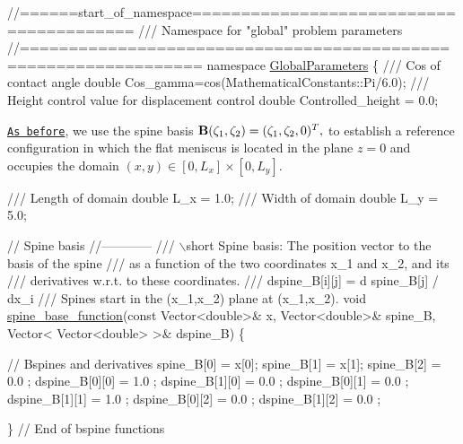  
\begin{DoxyCodeInclude}
\textcolor{comment}{//======start\_of\_namespace========================================}
\textcolor{comment}{/// Namespace for "global" problem parameters}
\textcolor{comment}{}\textcolor{comment}{//================================================================}
\textcolor{keyword}{namespace }\hyperlink{namespaceGlobalParameters}{GlobalParameters}
\{
\textcolor{comment}{}
\textcolor{comment}{ /// Cos of contact angle }
\textcolor{comment}{} \textcolor{keywordtype}{double} Cos\_gamma=cos(MathematicalConstants::Pi/6.0);
\textcolor{comment}{}
\textcolor{comment}{ /// Height control value for displacement control}
\textcolor{comment}{} \textcolor{keywordtype}{double} Controlled\_height = 0.0;

\end{DoxyCodeInclude}


\href{../../young_laplace/html/index.html}{\tt As before}, we use the spine basis $ {\bf B}(\zeta_1,\zeta_2)=(\zeta_1,\zeta_2,0)^T, $ to establish a reference configuration in which the flat meniscus is located in the plane $ z=0 $ and occupies the domain $ (x,y) \in [0,L_x] \times [0,L_y]. $


\begin{DoxyCodeInclude}
\textcolor{comment}{}
\textcolor{comment}{ /// Length of domain}
\textcolor{comment}{} \textcolor{keywordtype}{double} L\_x = 1.0; 
\textcolor{comment}{}
\textcolor{comment}{ /// Width of domain}
\textcolor{comment}{} \textcolor{keywordtype}{double} L\_y = 5.0; 

 \textcolor{comment}{// Spine basis}
 \textcolor{comment}{//------------}
\textcolor{comment}{}
\textcolor{comment}{ /// \(\backslash\)short Spine basis: The position vector to the basis of the spine}
\textcolor{comment}{ /// as a function of the two coordinates x\_1 and x\_2, and its}
\textcolor{comment}{ /// derivatives w.r.t. to these coordinates. }
\textcolor{comment}{ /// dspine\_B[i][j] = d spine\_B[j] / dx\_i}
\textcolor{comment}{ /// Spines start in the (x\_1,x\_2) plane at (x\_1,x\_2).}
\textcolor{comment}{} \textcolor{keywordtype}{void} \hyperlink{namespaceGlobalParameters_ac81daf87f8d3f075d9fd108427e70c4f}{spine\_base\_function}(\textcolor{keyword}{const} Vector<double>& x, 
                          Vector<double>& spine\_B, 
                          Vector< Vector<double> >& dspine\_B)
 \{
  
  \textcolor{comment}{// Bspines and derivatives }
  spine\_B[0]     = x[0];
  spine\_B[1]     = x[1];
  spine\_B[2]     = 0.0 ;
  dspine\_B[0][0] = 1.0 ;
  dspine\_B[1][0] = 0.0 ;
  dspine\_B[0][1] = 0.0 ; 
  dspine\_B[1][1] = 1.0 ;
  dspine\_B[0][2] = 0.0 ;
  dspine\_B[1][2] = 0.0 ;
  
 \} \textcolor{comment}{// End of bspine functions}

\end{DoxyCodeInclude}



